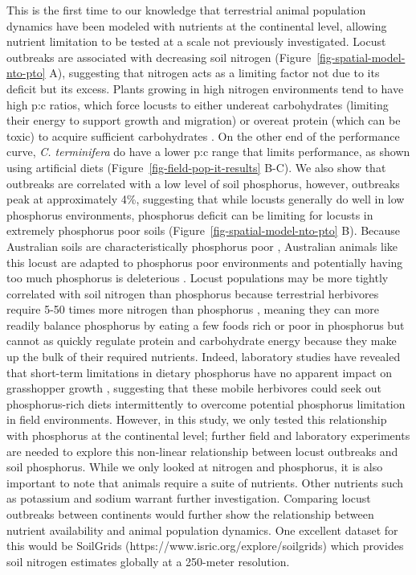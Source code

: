 \documentclass[
]{article}
\begin{document}
This is the first time to our knowledge that terrestrial animal
population dynamics have been modeled with nutrients at the continental
level, allowing nutrient limitation to be tested at a scale not
previously investigated. Locust outbreaks are associated with decreasing
soil nitrogen (Figure~\ref{fig-spatial-model-nto-pto} A), suggesting
that nitrogen acts as a limiting factor not due to its deficit
\citep{white_inadequate_1993} but its excess. Plants growing in high
nitrogen environments tend to have high p:c ratios, which force locusts
to either undereat carbohydrates (limiting their energy to support
growth and migration) or overeat protein (which can be toxic) to acquire
sufficient carbohydrates \citep{behmer_insect_2009, cease_how_2024}. On
the other end of the performance curve, \emph{C. terminifera} do have a
lower p:c range that limits performance, as shown using artificial diets
(Figure~\ref{fig-field-pop-it-results} B-C). We also show that outbreaks
are correlated with a low level of soil phosphorus, however, outbreaks
peak at approximately 4\%, suggesting that while locusts generally do
well in low phosphorus environments, phosphorus deficit can be limiting
for locusts in extremely phosphorus poor soils
(Figure~\ref{fig-spatial-model-nto-pto} B). Because Australian soils are
characteristically phosphorus poor \citep{donald_colin_phosphorus_1964},
Australian animals like this locust are adapted to phosphorus poor
environments and potentially having too much phosphorus is deleterious
\citep{morton_fresh_2011}. Locust populations may be more tightly
correlated with soil nitrogen than phosphorus because terrestrial
herbivores require 5-50 times more nitrogen than phosphorus
\citep{elser_nutritional_2000}, meaning they can more readily balance
phosphorus by eating a few foods rich or poor in phosphorus but cannot
as quickly regulate protein and carbohydrate energy because they make up
the bulk of their required nutrients. Indeed, laboratory studies have
revealed that short-term limitations in dietary phosphorus have no
apparent impact on grasshopper growth \citep{cease_dietary_2016},
suggesting that these mobile herbivores could seek out phosphorus-rich
diets intermittently to overcome potential phosphorus limitation in
field environments. However, in this study, we only tested this
relationship with phosphorus at the continental level; further field and
laboratory experiments are needed to explore this non-linear
relationship between locust outbreaks and soil phosphorus. While we only
looked at nitrogen and phosphorus, it is also important to note that
animals require a suite of nutrients. Other nutrients such as potassium
and sodium \citep{joern_not_2012} warrant further investigation.
Comparing locust outbreaks between continents would further show the
relationship between nutrient availability and animal population
dynamics. One excellent dataset for this would be SoilGrids
(https://www.isric.org/explore/soilgrids) which provides soil nitrogen
estimates globally at a 250-meter resolution.
\end{document}
